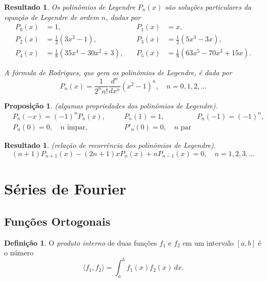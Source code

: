 \documentclass{article}
\theoremstyle{plain}
\newtheorem{prop}[thm]{Proposição}
\newtheorem{res}[thm]{Resultado}
\theoremstyle{definition}
\newtheorem{defn}{Definição}[section]
\theoremstyle{remark}
\begin{document}
\begin{res}
    Os polinômios de Legendre \(P_n(x)\) são soluções particulares da equação de Legendre de ordem \(n\), dadas por
    \begin{align*}
        P_0(x) &= 1, & \quad P_1(x) &= x,\\
        P_2(x) &= \frac{1}{2}(3x^2 - 1), & \quad P_3(x) &= \frac{1}{2}(5x^3 - 3x),\\
        P_4(x) &= \frac{1}{8}(35x^4 - 30x^2 + 3), & \quad P_5(x) &= \frac{1}{8}(63x^5 - 70x^3 + 15x). 
    \end{align*}

    \noindent A fórmula de Rodrigues, que gera os polinômios de Legendre, é dada por
    \begin{equation}\label{eq:rodrigues}
        P_n(x) = \frac{1}{2^n n!} \frac{d^n}{dx^n} (x^2 - 1)^n, \quad n=0,1,2,\ldots
    \end{equation}
\end{res}

\begin{prop} (algumas propriedades dos polinômios de Legendre).
    \begin{align*}
        &P_n(-x) = (-1)^n P_n(x), &\quad & P_n(1) = 1, \quad & P_n(-1) = (-1)^n, \\
        &P_n(0) = 0, \quad n \text{ ímpar}, &\quad & P'_n(0) = 0, \quad n \text{ par} &
    \end{align*}
\end{prop}

\begin{res} (relação de recorrência dos polinômios de Legendre).
    \begin{equation}\label{eq:recorrencia-legendre}
        (n+1)P_{n+1}(x) - (2n+1)xP_n(x) + nP_{n-1}(x) = 0, \quad n=1,2,3,\ldots
    \end{equation}
\end{res}

\section{Séries de Fourier}

\subsection{Funções Ortogonais}

\begin{defn} 
    O \emph{produto interno} de duas funções \(f_1\) e \(f_2\) em um intervalo \([a,b]\) é o número
    \begin{equation}
        \langle f_1, f_2 \rangle = \int_a^b f_1(x)f_2(x) \, dx.
    \end{equation}
\end{defn}
\end{document}
